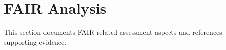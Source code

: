 \section{FAIR Analysis}

This section documents FAIR-related assessment aspects and references supporting evidence.
